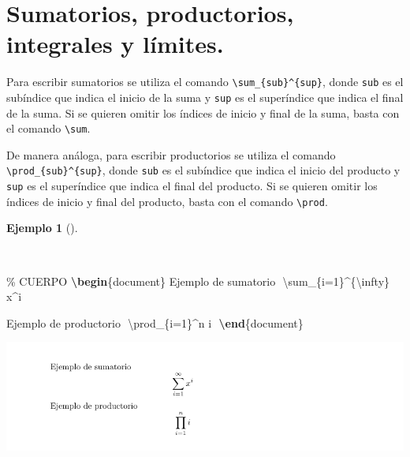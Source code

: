 \documentclass[
  a4paper,
]{scrreport}
\newenvironment{Shaded}{\begin{snugshade}}{\end{snugshade}}
\newcommand{\CommentTok}[1]{\textcolor[rgb]{0.37,0.37,0.37}{#1}}
\newcommand{\ExtensionTok}[1]{\textcolor[rgb]{0.00,0.23,0.31}{#1}}
\newcommand{\KeywordTok}[1]{\textcolor[rgb]{0.00,0.23,0.31}{\textbf{#1}}}
\newcommand{\NormalTok}[1]{\textcolor[rgb]{0.00,0.23,0.31}{#1}}
\newcommand{\SpecialCharTok}[1]{\textcolor[rgb]{0.37,0.37,0.37}{#1}}
\newcommand{\SpecialStringTok}[1]{\textcolor[rgb]{0.13,0.47,0.30}{#1}}
\theoremstyle{definition}
\newtheorem{example}{Ejemplo}[chapter]
\theoremstyle{remark}
\begin{document}
\section{Sumatorios, productorios, integrales y
límites.}\label{sumatorios-productorios-integrales-y-luxedmites.}

Para escribir sumatorios se utiliza el comando
\texttt{\textbackslash{}sum\_\{sub\}\^{}\{sup\}}, donde \texttt{sub} es
el subíndice que indica el inicio de la suma y \texttt{sup} es el
superíndice que indica el final de la suma. Si se quieren omitir los
índices de inicio y final de la suma, basta con el comando
\texttt{\textbackslash{}sum}.

De manera análoga, para escribir productorios se utiliza el comando
\texttt{\textbackslash{}prod\_\{sub\}\^{}\{sup\}}, donde \texttt{sub} es
el subíndice que indica el inicio del producto y \texttt{sup} es el
superíndice que indica el final del producto. Si se quieren omitir los
índices de inicio y final del producto, basta con el comando
\texttt{\textbackslash{}prod}.

\begin{example}[]\protect\hypertarget{exm-sumatorio-productorio}{}\label{exm-sumatorio-productorio}

~

\begin{Shaded}
\begin{Highlighting}[]
\CommentTok{\% CUERPO}
\KeywordTok{\textbackslash{}begin}\NormalTok{\{}\ExtensionTok{document}\NormalTok{\}}
\NormalTok{Ejemplo de sumatorio}
\SpecialStringTok{$$}
\SpecialCharTok{\textbackslash{}sum}\SpecialStringTok{\_\{i=1\}\^{}\{}\SpecialCharTok{\textbackslash{}infty}\SpecialStringTok{\} x\^{}i}
\SpecialStringTok{$$}

\NormalTok{Ejemplo de productorio}
\SpecialStringTok{$$}
\SpecialCharTok{\textbackslash{}prod}\SpecialStringTok{\_\{i=1\}\^{}n i}
\SpecialStringTok{$$}
\KeywordTok{\textbackslash{}end}\NormalTok{\{}\ExtensionTok{document}\NormalTok{\}}
\end{Highlighting}
\end{Shaded}

\begin{tcolorbox}[enhanced jigsaw, colframe=quarto-callout-note-color-frame, opacityback=0, title={Salida}, bottomrule=.15mm, left=2mm, coltitle=black, arc=.35mm, leftrule=.75mm, colback=white, rightrule=.15mm, colbacktitle=quarto-callout-note-color!10!white, toprule=.15mm, breakable, opacitybacktitle=0.6, bottomtitle=1mm, toptitle=1mm, titlerule=0mm]

\includegraphics{img/formulas/sumatorio.png}

\end{tcolorbox}

\end{example}
\end{document}
